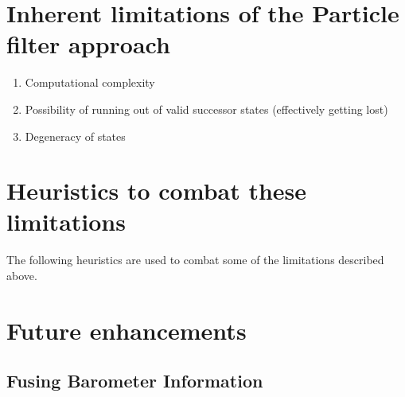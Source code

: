 \section{Inherent limitations of the Particle filter approach}

\begin{enumerate}
\item Computational complexity
\item Possibility of running out of valid successor states (effectively getting lost)
\item Degeneracy of states
\end{enumerate}

\section{Heuristics to combat these limitations}

The following heuristics are used to combat some of the limitations 
described above.

\section{Future enhancements}
\subsection{Fusing Barometer Information}

